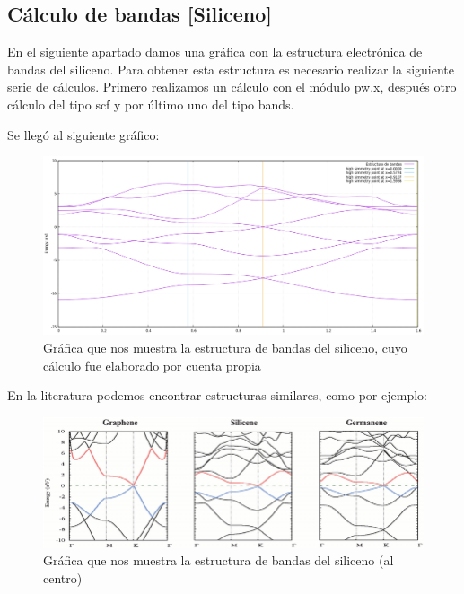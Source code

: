 
\subsection{Cálculo de bandas [Siliceno]}

En el siguiente apartado damos una gráfica con la estructura electrónica de bandas del siliceno. 
Para obtener esta estructura es necesario realizar la siguiente serie de cálculos.
Primero realizamos un cálculo con el módulo pw.x, después otro cálculo 
del tipo scf y por último uno del tipo bands.

Se llegó al siguiente gráfico:

\begin{figure}[H]
    \centering
    \includegraphics[scale=0.45]{images_siliceno/bands_structure.png}
    \caption{Gráfica que nos muestra la estructura de bandas del siliceno, cuyo cálculo fue elaborado por cuenta propia}
\end{figure}

En la literatura podemos encontrar estructuras similares, como por ejemplo:

\begin{figure}[H]
    \centering
    \includegraphics[scale=0.5]{images_siliceno/Band-structures-of-graphene-left-silicene-centre-and-germanene-right-Valence-and.png}
    \caption{Gráfica que nos muestra la estructura de bandas del siliceno (al centro) \cite{miro2014atlas} }
\end{figure}

